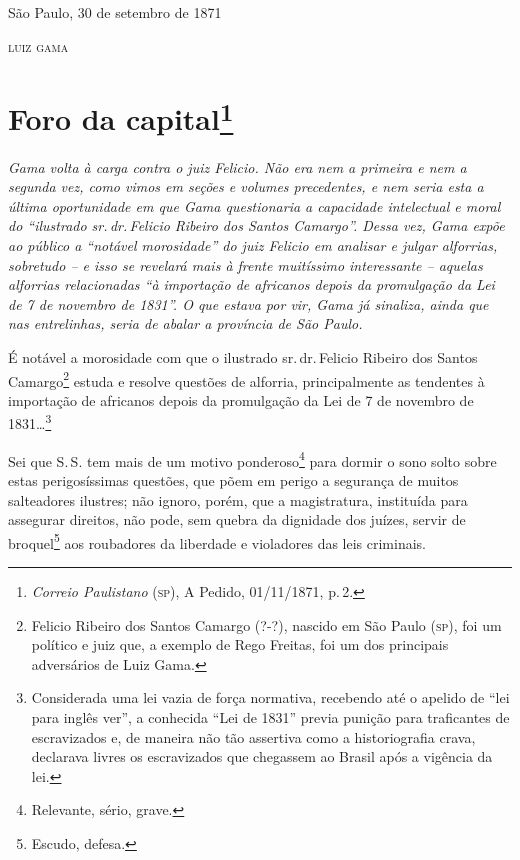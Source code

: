\begin{flushright}
São Paulo, 30 de setembro de 1871

\textsc{luiz gama}
\end{flushright}

\chapter{Foro da capital\footnote{\emph{Correio Paulistano} (\textsc{sp}), A Pedido, 01/11/1871,
  p.\,2.}} %

\begin{didascalia}
\emph{Gama volta à carga contra o juiz Felicio. Não era nem a primeira e
nem a segunda vez, como vimos em seções e volumes precedentes, e nem
seria esta a última oportunidade em que Gama questionaria a capacidade
intelectual e moral do ``ilustrado sr.\,dr.\,Felicio Ribeiro dos Santos
Camargo''. Dessa vez, Gama expõe ao público a ``notável morosidade'' do
juiz Felicio em analisar e julgar alforrias, sobretudo -- e isso se
revelará mais à frente muitíssimo interessante -- aquelas alforrias
relacionadas ``à importação de africanos depois da promulgação da Lei de
7 de novembro de 1831''. O que estava por vir, Gama já sinaliza, ainda
que nas entrelinhas, seria de abalar a província de São Paulo.}
\end{didascalia}

É notável a morosidade com que o ilustrado sr.\,dr.\,Felicio Ribeiro dos
Santos Camargo\footnote{ Felicio Ribeiro dos Santos Camargo (?-?),
  nascido em São Paulo (\textsc{sp}), foi um político e juiz que, a exemplo de
  Rego Freitas, foi um dos principais adversários de Luiz Gama.} estuda
e resolve questões de alforria, principalmente as tendentes à importação
de africanos depois da promulgação da Lei de 7 de novembro de
1831\ldots{}\footnote{ Considerada uma lei vazia de força normativa,
  recebendo até o apelido de ``lei para inglês ver'', a conhecida ``Lei de
  1831'' previa punição para traficantes de escravizados e, de maneira
  não tão assertiva como a historiografia crava, declarava livres os
  escravizados que chegassem ao Brasil após a vigência da lei.}

Sei que S.\,S. tem mais de um motivo ponderoso\footnote{ Relevante,
  sério, grave.} para dormir o sono solto sobre estas perigosíssimas
questões, que põem em perigo a segurança de muitos salteadores ilustres;
não ignoro, porém, que a magistratura, instituída para assegurar
direitos, não pode, sem quebra da dignidade dos juízes, servir de
broquel\footnote{ Escudo, defesa.} aos roubadores da liberdade e
violadores das leis criminais.

